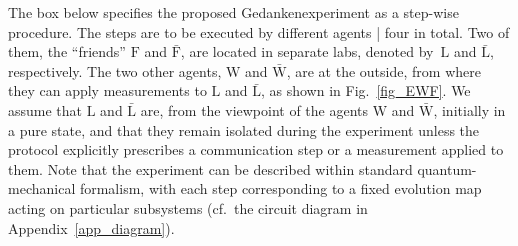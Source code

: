 \documentclass[12pt]{article}
\theoremstyle{mystyle}
\theoremstyle{definition}
\newcommand*{\Friendone}{\mathrm{\bar{F}}}
\newcommand*{\Friendtwo}{\mathrm{F}}
\newcommand*{\Labone}{\mathrm{\bar{L}}}
\newcommand*{\Labtwo}{\mathrm{L}}
\newcommand*{\Assistant}{\mathrm{\bar{W}}}
\newcommand*{\Wigner}{\mathrm{W}}
\begin{document}
The box below specifies the proposed Gedankenexperiment as a step-wise procedure. The steps are to be executed by different agents | four in total. Two of them, the ``friends'' $\Friendtwo$ and $\Friendone$, are located in  separate labs, denoted by~$\Labtwo$ and $\Labone$, respectively. The two other agents, $\Wigner$ and $\Assistant$, are at the outside, from where they can apply measurements to $\Labtwo$ and $\Labone$, as shown in Fig.~\ref{fig_EWF}. We assume that $\Labtwo$ and $\Labone$ are, from the viewpoint of the agents $\Wigner$ and $\Assistant$, initially in a pure state, and that they remain isolated during the experiment unless the  protocol explicitly prescribes a communication step or a measurement applied to them. Note that the experiment can be described within standard quantum-mechanical formalism, with each step  corresponding to a fixed evolution map acting on particular subsystems (cf.\ the circuit diagram in Appendix~\ref{app_diagram}).
\end{document}
